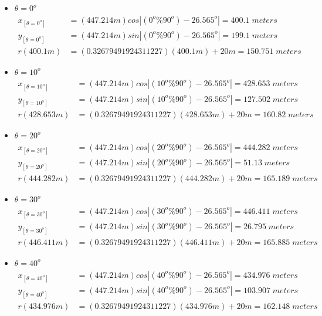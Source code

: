     \begin{itemize}
\item $\theta=0^o$
	\begin{align*}%
		x_{[\theta=0^o]} &=(447.214m) cos\left| (0^o\%90^o) - 26.565^o \right|  =400.1\;meters \\
		y_{[\theta=0^o]} &=(447.214m) sin\left| (0^o\%90^o) - 26.565^o \right|  =199.1\;meters \\
		r(400.1m) &=(0.32679491924311227)(400.1m)+20m  =150.751\;meters\end{align*}
\item $\theta=10^o$
	\begin{align*}%
		x_{[\theta=10^o]} &=(447.214m) cos\left| (10^o\%90^o) - 26.565^o \right|  =428.653\;meters \\
		y_{[\theta=10^o]} &=(447.214m) sin\left| (10^o\%90^o) - 26.565^o \right|  =127.502\;meters \\
		r(428.653m) &=(0.32679491924311227)(428.653m)+20m  =160.82\;meters\end{align*}
\item $\theta=20^o$
	\begin{align*}%
		x_{[\theta=20^o]} &=(447.214m) cos\left| (20^o\%90^o) - 26.565^o \right|  =444.282\;meters \\
		y_{[\theta=20^o]} &=(447.214m) sin\left| (20^o\%90^o) - 26.565^o \right|  =51.13\;meters \\
		r(444.282m) &=(0.32679491924311227)(444.282m)+20m  =165.189\;meters\end{align*}
\item $\theta=30^o$
	\begin{align*}%
		x_{[\theta=30^o]} &=(447.214m) cos\left| (30^o\%90^o) - 26.565^o \right|  =446.411\;meters \\
		y_{[\theta=30^o]} &=(447.214m) sin\left| (30^o\%90^o) - 26.565^o \right|  =26.795\;meters \\
		r(446.411m) &=(0.32679491924311227)(446.411m)+20m  =165.885\;meters\end{align*}
\item $\theta=40^o$
	\begin{align*}%
		x_{[\theta=40^o]} &=(447.214m) cos\left| (40^o\%90^o) - 26.565^o \right|  =434.976\;meters \\
		y_{[\theta=40^o]} &=(447.214m) sin\left| (40^o\%90^o) - 26.565^o \right|  =103.907\;meters \\
		r(434.976m) &=(0.32679491924311227)(434.976m)+20m  =162.148\;meters\end{align*}

\end{itemize}
